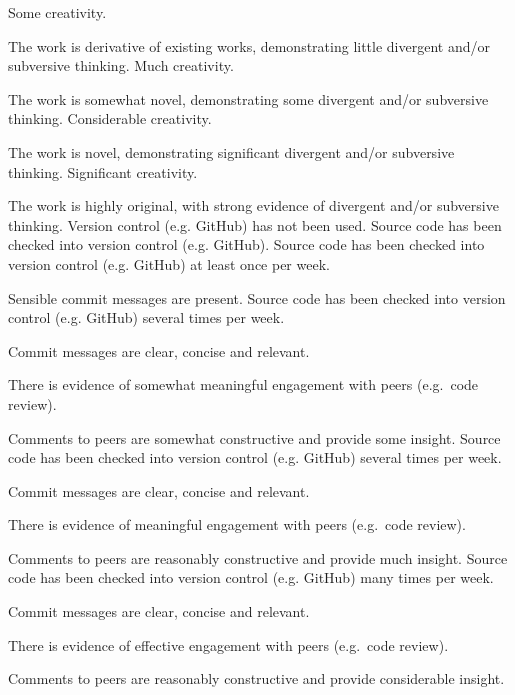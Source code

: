 \documentclass{../../fal_assignment}
\begin{document}
\begin{markingrubric}
	\grade Some creativity.
	\par The work is derivative of existing works, demonstrating little divergent and/or subversive thinking.
	\grade Much creativity.
	\par The work is somewhat novel, demonstrating some divergent and/or subversive thinking.
	\grade Considerable creativity.
	\par The work is novel, demonstrating significant divergent and/or subversive thinking.
	\grade Significant creativity.
	\par The work is highly original, with strong evidence of divergent and/or subversive thinking.
	\grade\fail Version control (e.g. GitHub) has not been used.
	\grade Source code has been checked into version control (e.g. GitHub).
	\grade Source code has been checked into version control (e.g. GitHub) at least once per week.
	\par Sensible commit messages are present.
	\grade Source code  has been checked into version control (e.g. GitHub) several times per week.
	\par Commit messages are clear, concise and relevant.
	\par There is evidence of somewhat meaningful engagement with peers (e.g.\ code review).
	\par Comments to peers are somewhat constructive and provide some insight.
	\grade Source code has been checked into version control (e.g. GitHub) several times per week.
	\par Commit messages are clear, concise and relevant.
	\par There is evidence of meaningful engagement with peers (e.g.\ code review).
	\par Comments to peers are reasonably constructive and provide much insight.
	\grade Source code has been checked into version control (e.g. GitHub) many times per week.
	\par Commit messages are clear, concise and relevant.
	\par There is evidence of effective engagement with peers (e.g.\ code review).
	\par Comments to peers are reasonably constructive and provide considerable insight.
\end{markingrubric}
	
\end{document}
